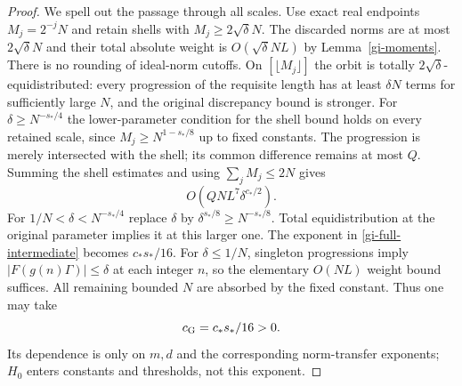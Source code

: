 \documentclass[11pt]{article}
\theoremstyle{definition}
\theoremstyle{remark}
\begin{document}
\begin{proof}
We spell out the passage through all scales.  Use exact real endpoints
$M_j=2^{-j}N$ and retain shells with $M_j\geq2\sqrt\delta N$.
The discarded norms are at most $2\sqrt\delta N$ and their total
absolute weight is $O(\sqrt\delta NL)$ by Lemma~\ref{gi-moments}.
There is no rounding of ideal-norm cutoffs.  On $[\lfloor M_j\rfloor]$
the orbit is totally $2\sqrt\delta$-equidistributed: every progression
of the requisite length has at least $\delta N$ terms for sufficiently
large $N$, and the original discrepancy bound is stronger.
For $\delta\geq N^{-s_*/4}$ the lower-parameter condition for the shell
bound holds on every retained scale, since
$M_j\geq N^{1-s_*/8}$ up to fixed constants.  The progression is merely
intersected with the shell; its common difference remains at most $Q$.
Summing the shell estimates and using $\sum_jM_j\leq2N$ gives
\begin{equation}\label{gi-full-intermediate}
                  O(QNL^7\delta^{c_*/2}).
\end{equation}
For $1/N<\delta<N^{-s_*/4}$ replace $\delta$ by
$\delta^{s_*/8}\geq N^{-s_*/8}$.  Total equidistribution at the
original parameter implies it at this larger one.  The exponent in
\eqref{gi-full-intermediate} becomes $c_*s_*/16$.
For $\delta\leq1/N$, singleton progressions imply
$|F(g(n)\Gamma)|\leq\delta$ at each integer $n$, so the elementary
$O(NL)$ weight bound suffices.  All remaining bounded $N$ are absorbed
by the fixed constant.  Thus one may take
\begin{equation}\label{gi-final-exponent}
                         c_{\rm G}=c_*s_*/16>0.
\end{equation}
Its dependence is only on $m,d$ and the corresponding norm-transfer
exponents; $H_0$ enters constants and thresholds, not this exponent.
\end{proof}
\end{document}
